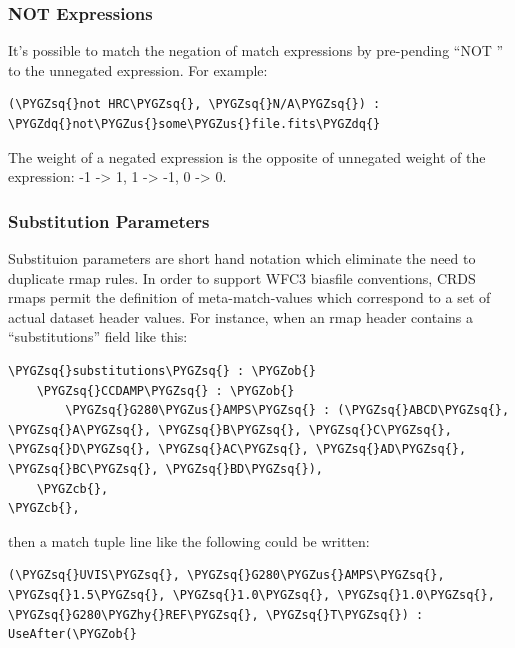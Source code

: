 \documentclass[letterpaper,10pt,english]{sphinxmanual}
\def\PYGZus{\char`\_}
\def\PYGZob{\char`\{}
\def\PYGZcb{\char`\}}
\def\PYGZhy{\char`\-}
\def\PYGZsq{\char`\'}
\def\PYGZdq{\char`\"}
\renewcommand\PYGZsq{\textquotesingle}
\begin{document}
\subsubsection{NOT Expressions}
\label{rmap_syntax:not-expressions}
It's possible to match the negation of match expressions by pre-pending ``NOT ''
to the unnegated expression.   For example:

\begin{Verbatim}[commandchars=\\\{\}]
(\PYGZsq{}not HRC\PYGZsq{}, \PYGZsq{}N/A\PYGZsq{}) :  \PYGZdq{}not\PYGZus{}some\PYGZus{}file.fits\PYGZdq{}
\end{Verbatim}

The weight of a negated expression is the opposite of unnegated weight of the
expression: -1 -\textgreater{} 1, 1 -\textgreater{} -1, 0 -\textgreater{} 0.


\subsubsection{Substitution Parameters}
\label{rmap_syntax:substitution-parameters}
Substituion parameters are short hand notation which eliminate the need to
duplicate rmap rules.  In order to support WFC3 biasfile conventions,  CRDS
rmaps permit the definition of meta-match-values which correspond to a set of
actual dataset header values. For instance,  when an rmap header contains a
``substitutions'' field like this:

\begin{Verbatim}[commandchars=\\\{\}]
\PYGZsq{}substitutions\PYGZsq{} : \PYGZob{}
    \PYGZsq{}CCDAMP\PYGZsq{} : \PYGZob{}
        \PYGZsq{}G280\PYGZus{}AMPS\PYGZsq{} : (\PYGZsq{}ABCD\PYGZsq{}, \PYGZsq{}A\PYGZsq{}, \PYGZsq{}B\PYGZsq{}, \PYGZsq{}C\PYGZsq{}, \PYGZsq{}D\PYGZsq{}, \PYGZsq{}AC\PYGZsq{}, \PYGZsq{}AD\PYGZsq{}, \PYGZsq{}BC\PYGZsq{}, \PYGZsq{}BD\PYGZsq{}),
    \PYGZcb{},
\PYGZcb{},
\end{Verbatim}

then a match tuple line like the following could be written:

\begin{Verbatim}[commandchars=\\\{\}]
(\PYGZsq{}UVIS\PYGZsq{}, \PYGZsq{}G280\PYGZus{}AMPS\PYGZsq{}, \PYGZsq{}1.5\PYGZsq{}, \PYGZsq{}1.0\PYGZsq{}, \PYGZsq{}1.0\PYGZsq{}, \PYGZsq{}G280\PYGZhy{}REF\PYGZsq{}, \PYGZsq{}T\PYGZsq{}) : UseAfter(\PYGZob{}
\end{Verbatim}
\end{document}

